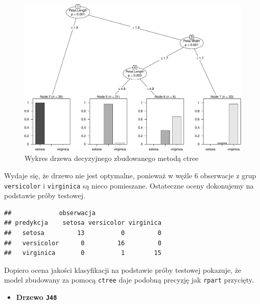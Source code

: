 \documentclass[]{book}
\newenvironment{Shaded}{\begin{snugshade}}{\end{snugshade}}
\newcommand{\DataTypeTok}[1]{\textcolor[rgb]{0.13,0.29,0.53}{#1}}
\newcommand{\KeywordTok}[1]{\textcolor[rgb]{0.13,0.29,0.53}{\textbf{#1}}}
\newcommand{\NormalTok}[1]{#1}
\newcommand{\OperatorTok}[1]{\textcolor[rgb]{0.81,0.36,0.00}{\textbf{#1}}}
\newcommand{\StringTok}[1]{\textcolor[rgb]{0.31,0.60,0.02}{#1}}
\providecommand{\tightlist}{%
  \setlength{\itemsep}{0pt}\setlength{\parskip}{0pt}}
\theoremstyle{plain}
\theoremstyle{definition}
\theoremstyle{definition}
\theoremstyle{definition}
\theoremstyle{definition}
\theoremstyle{remark}
\begin{document}
\begin{figure}
\centering
\includegraphics{EksploracjaDanych_files/figure-latex/ctree-1.pdf}
\caption{\label{fig:ctree}Wykres drzewa decyzyjnego zbudowanego metodą ctree}
\end{figure}

Wydaje się, że drzewo nie jest optymalne, ponieważ w węźle 6 obserwacje z grup \texttt{versicolor} i \texttt{virginica} są nieco pomieszane. Ostateczne oceny dokonujemy na podstawie próby testowej.

\begin{Shaded}
\end{Shaded}

\begin{verbatim}
##             obserwacja
## predykcja    setosa versicolor virginica
##   setosa         13          0         0
##   versicolor      0         16         0
##   virginica       0          1        15
\end{verbatim}

Dopiero ocena jakości klasyfikacji na podstawie próby testowej pokazuje, że model zbudowany za pomocą \texttt{ctree} daje podobną precyzję jak \texttt{rpart} przycięty.

\begin{itemize}
\tightlist
\item
  \textbf{Drzewo \texttt{J48}}
\end{itemize}
\end{document}

